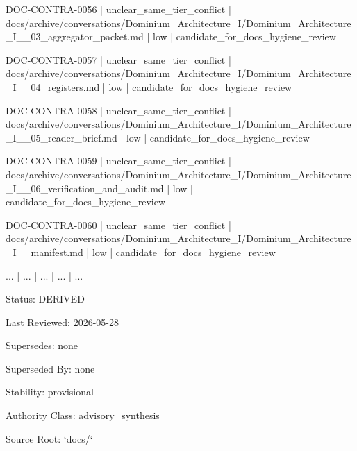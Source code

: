 \documentclass[11pt,a4paper]{report}
\begin{document}
{\small\ttfamily\raggedright DOC-\allowbreak{}CONTRA-\allowbreak{}0056 | unclear\_same\_tier\_conflict | docs/\allowbreak{}archive/\allowbreak{}conversations/\allowbreak{}Dominium\_Architecture\_I/\allowbreak{}Dominium\_Architecture\_I\_\_03\_aggregator\_packet.\allowbreak{}md | low | candidate\_for\_docs\_hygiene\_review\par}
{\small\ttfamily\raggedright DOC-\allowbreak{}CONTRA-\allowbreak{}0057 | unclear\_same\_tier\_conflict | docs/\allowbreak{}archive/\allowbreak{}conversations/\allowbreak{}Dominium\_Architecture\_I/\allowbreak{}Dominium\_Architecture\_I\_\_04\_registers.\allowbreak{}md | low | candidate\_for\_docs\_hygiene\_review\par}
{\small\ttfamily\raggedright DOC-\allowbreak{}CONTRA-\allowbreak{}0058 | unclear\_same\_tier\_conflict | docs/\allowbreak{}archive/\allowbreak{}conversations/\allowbreak{}Dominium\_Architecture\_I/\allowbreak{}Dominium\_Architecture\_I\_\_05\_reader\_brief.\allowbreak{}md | low | candidate\_for\_docs\_hygiene\_review\par}
{\small\ttfamily\raggedright DOC-\allowbreak{}CONTRA-\allowbreak{}0059 | unclear\_same\_tier\_conflict | docs/\allowbreak{}archive/\allowbreak{}conversations/\allowbreak{}Dominium\_Architecture\_I/\allowbreak{}Dominium\_Architecture\_I\_\_06\_verification\_and\_audit.\allowbreak{}md | low | candidate\_for\_docs\_hygiene\_review\par}
{\small\ttfamily\raggedright DOC-\allowbreak{}CONTRA-\allowbreak{}0060 | unclear\_same\_tier\_conflict | docs/\allowbreak{}archive/\allowbreak{}conversations/\allowbreak{}Dominium\_Architecture\_I/\allowbreak{}Dominium\_Architecture\_I\_\_manifest.\allowbreak{}md | low | candidate\_for\_docs\_hygiene\_review\par}
{\small\ttfamily\raggedright .\allowbreak{}.\allowbreak{}.\allowbreak{} | .\allowbreak{}.\allowbreak{}.\allowbreak{} | .\allowbreak{}.\allowbreak{}.\allowbreak{} | .\allowbreak{}.\allowbreak{}.\allowbreak{} | .\allowbreak{}.\allowbreak{}.\allowbreak{}\par}


Status: DERIVED

Last Reviewed: 2026-\allowbreak{}05-\allowbreak{}28

Supersedes: none

Superseded By: none

Stability: provisional

Authority Class: advisory\_synthesis

Source Root: `docs/\allowbreak{}`
\end{document}
